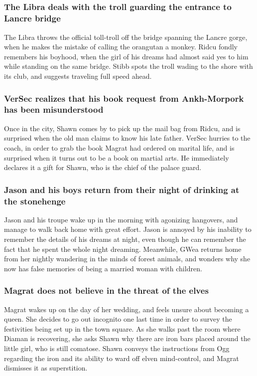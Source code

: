 \subsection{}
\subsubsection{The \Gls{Libra} deals with the troll guarding the entrance to Lancre bridge}
The \Gls{Libra} throws the official toll-troll off the bridge spanning the Lancre gorge, when he
makes the mistake of calling the orangutan a monkey. \Gls{Ridcu} fondly remembers his boyhood, when
the girl of his dreams had almost said yes to him while standing on the same bridge. \Gls{Stibb}
spots the troll wading to the shore with its club, and suggests traveling full speed ahead.

\subsubsection{\Gls{VerSec} realizes that his book request from Ankh-Morpork has been misunderstood}
Once in the city, \Gls{Shawn} comes by to pick up the mail bag from \Gls{Ridcu}, and is surprised
when the old man claims to know his late father. \Gls{VerSec} hurries to the coach, in order to
grab the book \Gls{Magrat} had ordered on marital life, and is surprised when it turns out to be a
book on martial arts. He immediately declares it a gift for \Gls{Shawn}, who is the chief of the
palace guard.

\subsubsection{\Gls{Jason} and his boys return from their night of drinking at the stonehenge}
\Gls{Jason} and his troupe wake up in the morning with agonizing hangovers, and manage to walk back
home with great effort. \Gls{Jason} is annoyed by his inability to remember the details of his
dreams at night, even though he can remember the fact that he spent the whole night dreaming.
Meanwhile, \Gls{GWea} returns home from her nightly wandering in the minds of forest animals, and
wonders why she now has false memories of being a married woman with children.

\subsubsection{\Gls{Magrat} does not believe in the threat of the elves}
\Gls{Magrat} wakes up on the day of her wedding, and feels unsure about becoming a queen. She
decides to go out incognito one last time in order to survey the festivities being set up in the
town square. As she walks past the room where \Gls{Diaman} is recovering, she asks \Gls{Shawn} why
there are iron bars placed around the little girl, who is still comatose. \Gls{Shawn} conveys the
instructions from \Gls{Ogg} regarding the iron and its ability to ward off elven mind-control, and
\Gls{Magrat} dismisses it as superstition.

